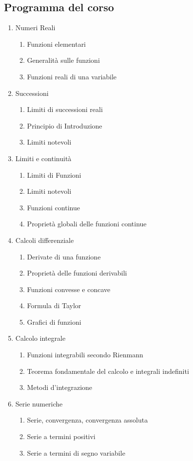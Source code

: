 \documentclass[12pt, a4paper, openany]{book}
\begin{document}
\subsection*{Programma del corso}
\begin{enumerate}
\item Numeri Reali
\begin{enumerate}
\item Funzioni elementari
\item Generalità sulle funzioni
\item Funzioni reali di una variabile
\end{enumerate}
\item Successioni
\begin{enumerate}
    \item Limiti di successioni reali
    \item Principio di Introduzione
    \item Limiti notevoli
\end{enumerate}
\item Limiti e continuità
\begin{enumerate}
    \item Limiti di Funzioni
    \item Limiti notevoli
    \item Funzioni continue
    \item Proprietà globali delle funzioni continue
\end{enumerate}
\item Calcoli differenziale
\begin{enumerate}
    \item Derivate di una funzione
    \item Proprietà delle funzioni derivabili
    \item Funzioni convesse e concave
    \item Formula di Taylor
    \item Grafici di funzioni
\end{enumerate}
\item Calcolo integrale
\begin{enumerate}
    \item Funzioni integrabili secondo Rienmann
    \item Teorema fondamentale del calcolo e integrali indefiniti
    \item Metodi d'integrazione
\end{enumerate}
\item Serie numeriche
\begin{enumerate}
    \item Serie, convergenza, convergenza assoluta
    \item Serie a termini positivi
    \item Serie a termini di segno variabile
\end{enumerate}
\end{enumerate}
\end{document}
